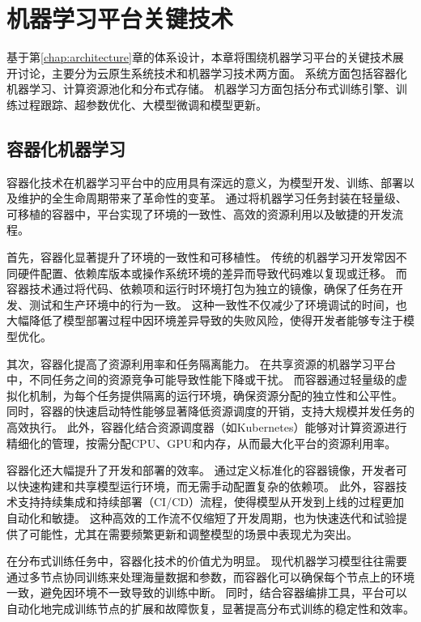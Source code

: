 
\chapter{机器学习平台关键技术}

基于第\ref{chap:architecture}章的体系设计，本章将围绕机器学习平台的关键技术展开讨论，主要分为云原生系统技术和机器学习技术两方面。
系统方面包括容器化机器学习、计算资源池化和分布式存储。
机器学习方面包括分布式训练引擎、训练过程跟踪、超参数优化、大模型微调和模型更新。


\section{容器化机器学习}

容器化技术在机器学习平台中的应用具有深远的意义，为模型开发、训练、部署以及维护的全生命周期带来了革命性的变革。
通过将机器学习任务封装在轻量级、可移植的容器中，平台实现了环境的一致性、高效的资源利用以及敏捷的开发流程。

首先，容器化显著提升了环境的一致性和可移植性。
传统的机器学习开发常因不同硬件配置、依赖库版本或操作系统环境的差异而导致代码难以复现或迁移。
而容器技术通过将代码、依赖项和运行时环境打包为独立的镜像，确保了任务在开发、测试和生产环境中的行为一致。
这种一致性不仅减少了环境调试的时间，也大幅降低了模型部署过程中因环境差异导致的失败风险，使得开发者能够专注于模型优化。

其次，容器化提高了资源利用率和任务隔离能力。
在共享资源的机器学习平台中，不同任务之间的资源竞争可能导致性能下降或干扰。
而容器通过轻量级的虚拟化机制，为每个任务提供隔离的运行环境，确保资源分配的独立性和公平性。
同时，容器的快速启动特性能够显著降低资源调度的开销，支持大规模并发任务的高效执行。
此外，容器化结合资源调度器（如Kubernetes）能够对计算资源进行精细化的管理，按需分配CPU、GPU和内存，从而最大化平台的资源利用率。

容器化还大幅提升了开发和部署的效率。
通过定义标准化的容器镜像，开发者可以快速构建和共享模型运行环境，而无需手动配置复杂的依赖项。
此外，容器技术支持持续集成和持续部署（CI/CD）流程，使得模型从开发到上线的过程更加自动化和敏捷。
这种高效的工作流不仅缩短了开发周期，也为快速迭代和试验提供了可能性，尤其在需要频繁更新和调整模型的场景中表现尤为突出。

在分布式训练任务中，容器化技术的价值尤为明显。
现代机器学习模型往往需要通过多节点协同训练来处理海量数据和参数，而容器化可以确保每个节点上的环境一致，避免因环境不一致导致的训练中断。
同时，结合容器编排工具，平台可以自动化地完成训练节点的扩展和故障恢复，显著提高分布式训练的稳定性和效率。

